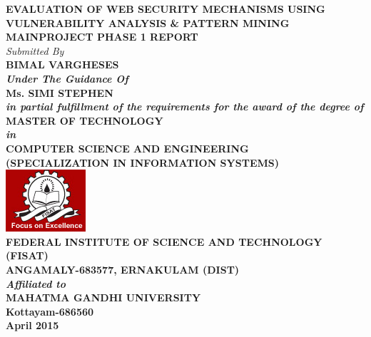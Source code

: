 \begin{center}
        \centering
        \large \textbf{EVALUATION OF WEB SECURITY MECHANISMS
        	USING VULNERABILITY ANALYSIS \& PATTERN MINING }\\[0.3cm]
        \large \textbf{MAINPROJECT PHASE 1 REPORT }\\[.25cm]
         \textit{Submitted By} \\ [0.2cm]
        \bfseries{BIMAL VARGHESES} \\[.4cm]
         \small{\textit{Under The Guidance Of}} \\ [0.2cm]
         \large \textbf{{Ms. SIMI STEPHEN}} \\[.3cm]
        \small{\textit{in partial fulfillment of the requirements for the award of the degree of}}\\[.6cm]
        \large{\bfseries MASTER OF TECHNOLOGY}\\[0.3cm]
        \small{\textit{in}}\\[0.3cm]
        \large{\bfseries COMPUTER SCIENCE AND ENGINEERING\\
        (SPECIALIZATION IN INFORMATION SYSTEMS)}
         \\[.5cm]
    \includegraphics[scale=1.1]{fisat.jpg}\\[.5\baselineskip]
           
        \large \bfseries{FEDERAL INSTITUTE OF SCIENCE AND TECHNOLOGY (FISAT)}\\
        \small \bfseries{ANGAMALY-683577, ERNAKULAM (DIST)}\\[0.3cm]
        \small {\textit{Affiliated to}}\\[.3cm]
        \large \bfseries{MAHATMA GANDHI UNIVERSITY}\\
        \small \bfseries{Kottayam-686560}\\[.3cm]
        \small \bfseries{April 2015}
\end{center}       




















